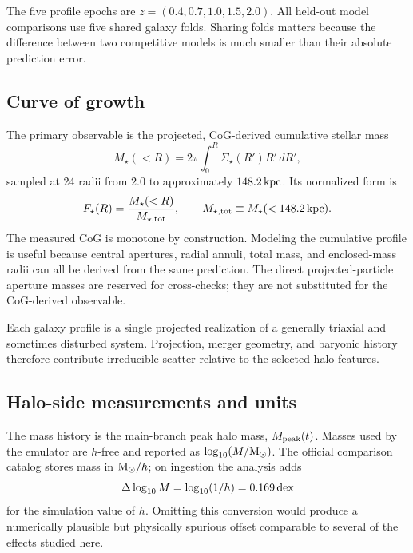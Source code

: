 The five profile epochs are $z=(0.4,0.7,1.0,1.5,2.0)$. All held-out model
comparisons use five shared galaxy folds. Sharing folds matters because the
difference between two competitive models is much smaller than their absolute
prediction error.

\subsection{Curve of growth}

The primary observable is the projected, CoG-derived cumulative stellar mass
\begin{equation}
  M_\star(<R)=2\pi\int_0^R \Sigma_\star(R')R'\,dR',
  \label{eq:cog_definition}
\end{equation}
sampled at 24 radii from $2.0$ to approximately $148.2\,\mathrm{kpc}$. Its normalized
form is
\begin{equation}
  F_\star(R)=\frac{M_\star(<R)}{M_{\star,\rm tot}},\qquad
  M_{\star,\rm tot}\equiv M_\star(<148.2\,\mathrm{kpc}).
  \label{eq:normalized_cog}
\end{equation}
The measured CoG is monotone by construction. Modeling the cumulative profile
is useful because central apertures, radial annuli, total mass, and enclosed-mass
radii can all be derived from the same prediction. The direct projected-particle
aperture masses are reserved for cross-checks; they are not substituted for the
CoG-derived observable.

Each galaxy profile is a single projected realization of a generally triaxial
and sometimes disturbed system. Projection, merger geometry, and baryonic
history therefore contribute irreducible scatter relative to the selected halo
features.

\subsection{Halo-side measurements and units}

The mass history is the main-branch peak halo mass, $M_{\mathrm{peak}}(t)$. Masses used by
the emulator are $h$-free and reported as $\log_{10}(M/\mathrm{M}_{\odot})$. The official
\diffmah{} comparison catalog stores mass in $\mathrm{M}_{\odot}/h$; on ingestion the analysis
adds
\begin{equation}
  \Delta\log_{10} M=\log_{10}(1/h)=0.169\,\mathrm{dex}
\end{equation}
for the simulation value of $h$. Omitting this conversion would produce a
numerically plausible but physically spurious offset comparable to several of
the effects studied here.

